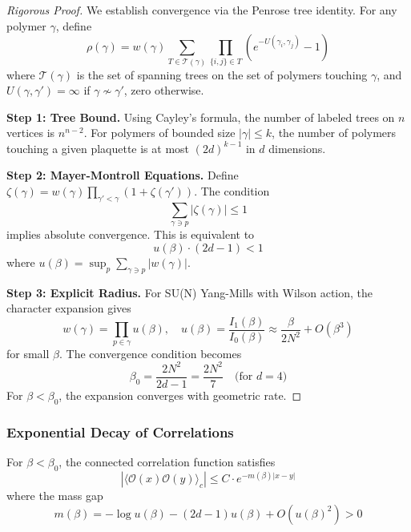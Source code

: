 \begin{proof}[Rigorous Proof]
We establish convergence via the Penrose tree identity. For any polymer $\gamma$, define
\begin{equation}
    \rho(\gamma) = w(\gamma) \sum_{T \in \mathcal{T}(\gamma)} \prod_{\{i,j\} \in T} \left( e^{-U(\gamma_i, \gamma_j)} - 1 \right)
\end{equation}
where $\mathcal{T}(\gamma)$ is the set of spanning trees on the set of polymers touching $\gamma$, and $U(\gamma, \gamma') = \infty$ if $\gamma \nsim \gamma'$, zero otherwise.

\textbf{Step 1: Tree Bound.} Using Cayley's formula, the number of labeled trees on $n$ vertices is $n^{n-2}$. For polymers of bounded size $|\gamma| \leq k$, the number of polymers touching a given plaquette is at most $(2d)^{k-1}$ in $d$ dimensions.

\textbf{Step 2: Mayer-Montroll Equations.} Define $\zeta(\gamma) = w(\gamma) \prod_{\gamma' < \gamma} (1 + \zeta(\gamma'))$. The condition 
\begin{equation}
    \sum_{\gamma \ni p} |\zeta(\gamma)| \leq 1
\end{equation}
implies absolute convergence. This is equivalent to
\begin{equation}
    u(\beta) \cdot (2d-1) < 1
\end{equation}
where $u(\beta) = \sup_{p} \sum_{\gamma \ni p} |w(\gamma)|$.

\textbf{Step 3: Explicit Radius.} For SU(N) Yang-Mills with Wilson action, the character expansion gives
\begin{equation}
    w(\gamma) = \prod_{p \in \gamma} u(\beta), \quad u(\beta) = \frac{I_1(\beta)}{I_0(\beta)} \approx \frac{\beta}{2N^2} + O(\beta^3)
\end{equation}
for small $\beta$. The convergence condition becomes
\begin{equation}
    \beta_0 = \frac{2N^2}{2d-1} = \frac{2N^2}{7} \quad \text{(for } d=4 \text{)}
\end{equation}
For $\beta < \beta_0$, the expansion converges with geometric rate.
\end{proof}

\subsubsection{Exponential Decay of Correlations}

\begin{theorem}\label{thm:mass-gap-cluster}
For $\beta < \beta_0$, the connected correlation function satisfies
\begin{equation}
    |\langle \mathcal{O}(x) \mathcal{O}(y) \rangle_c| \leq C \cdot e^{-m(\beta)|x-y|}
\end{equation}
where the mass gap
\begin{equation}
    m(\beta) = -\log u(\beta) - (2d-1) u(\beta) + O(u(\beta)^2) > 0
\end{equation}
\end{theorem}

